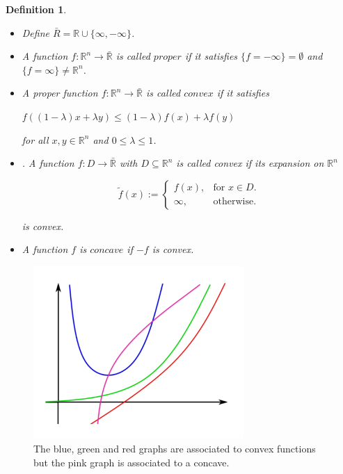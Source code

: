 \documentclass[a4paper]{book}
\newtheorem{definition}[theorem]{Definition}%
\numberwithin{theorem}{section}%
\begin{document}
\begin{definition}
	\begin{itemize}
		\item Define $\bar{R}=\mathbb{R}\cup\{ \infty,-\infty\}$.
		\item A function $f:\mathbb{R}^n\to\bar{\mathbb{R}}$ is called $proper$ if it satisfies $\{f=-\infty\}=\emptyset$ and $\{f=\infty\}\neq\mathbb{R}^n$.
		\item A proper function $f:\mathbb{R}^n\to\bar{\mathbb{R}}$ is called $convex$ if it satisfies 
		\begin{center}
			$\displaystyle f((1-\lambda)x+\lambda y)\leq(1-\lambda)f(x)+\lambda f(y)$
		\end{center}
		for all $x, y\in\mathbb{R}^n$ and $0\leq\lambda\leq1$.
		\item . A function $f:D\to\bar{\mathbb{R}}$ with $D\subseteq\mathbb{R}^n$ is called convex if its expansion on $\mathbb{R}^n$
		\begin{center}
			\begin{equation*}
				  \tilde{f}(x):=\begin{cases}
				    	f(x), & \text{for $x\in D$}.\\
				   	 \infty, & \text{otherwise}.
				  \end{cases}
			\end{equation*}
		\end{center}
		is convex.
		\item A function $f$ is $concave$ if $-f$ is convex.
	\end{itemize}
\end{definition}
\begin{figure}[h]
    \begin{center}   
        \includegraphics[width=80mm]{ConcaveFunction}
        \caption{The blue, green and red graphs are associated to convex functions but the pink graph is associated to a concave.}
    \end{center}
\end{figure}
\end{document}
